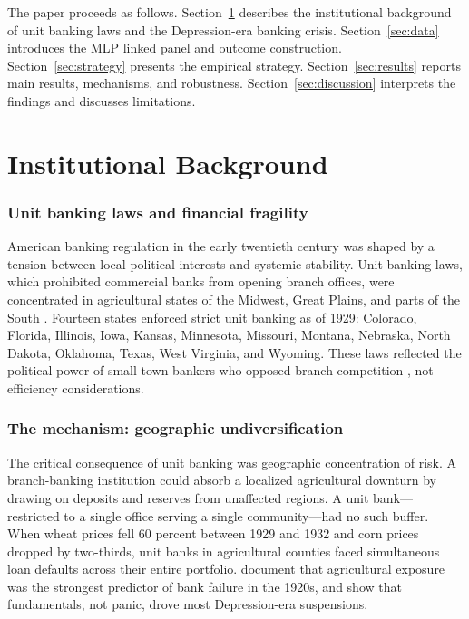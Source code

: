 \documentclass[12pt]{article}
\begin{document}
The paper proceeds as follows. Section~\ref{sec:background} describes the institutional background of unit banking laws and the Depression-era banking crisis. Section~\ref{sec:data} introduces the MLP linked panel and outcome construction. Section~\ref{sec:strategy} presents the empirical strategy. Section~\ref{sec:results} reports main results, mechanisms, and robustness. Section~\ref{sec:discussion} interprets the findings and discusses limitations.


\section{Institutional Background}
\label{sec:background}

\subsubsection*{Unit banking laws and financial fragility}
American banking regulation in the early twentieth century was shaped by a tension between local political interests and systemic stability. Unit banking laws, which prohibited commercial banks from opening branch offices, were concentrated in agricultural states of the Midwest, Great Plains, and parts of the South \citep{calomiris2014}. Fourteen states enforced strict unit banking as of 1929: Colorado, Florida, Illinois, Iowa, Kansas, Minnesota, Missouri, Montana, Nebraska, North Dakota, Oklahoma, Texas, West Virginia, and Wyoming. These laws reflected the political power of small-town bankers who opposed branch competition \citep{kroszner1999}, not efficiency considerations.

\subsubsection*{The mechanism: geographic undiversification}
The critical consequence of unit banking was geographic concentration of risk. A branch-banking institution could absorb a localized agricultural downturn by drawing on deposits and reserves from unaffected regions. A unit bank---restricted to a single office serving a single community---had no such buffer. When wheat prices fell 60 percent between 1929 and 1932 and corn prices dropped by two-thirds, unit banks in agricultural counties faced simultaneous loan defaults across their entire portfolio. \citet{alston1994} document that agricultural exposure was the strongest predictor of bank failure in the 1920s, and \citet{calomiris2003} show that fundamentals, not panic, drove most Depression-era suspensions.
\end{document}
